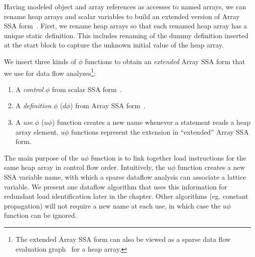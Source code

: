 Having modeled object and array references as accesses to
named arrays, we can rename heap arrays and scalar variables
to build an extended version of Array SSA form~\cite{KnSa98}.
First, we rename heap arrays so
that each renamed heap array
has a unique static definition.
This includes renaming of the dummy definition 
inserted at the start block to capture the unknown initial value
of the heap array.

We insert three kinds of $\phi$ functions 
to obtain an {\it extended}
Array SSA form that we use for data flow analyses\footnote{The extended
Array SSA form can also be viewed as a
sparse data flow evaluation graph~\cite{ChCF91} for
a heap array.}:
\begin{enumerate}
\item 
A {\em control} $\phi$ from scalar SSA form~\cite{CFRWZ91a}.
\item
A {\em definition} $\phi$ ($d\phi$) from Array SSA form~\cite{KnSa98,KnSa98b}.
\item
A {\em use} $\phi$ ($u\phi$) function creates
a new name whenever a statement reads a heap array element.
$u\phi$ functions represent the extension
in ``extended'' Array SSA form.

\end{enumerate}
The main purpose of the $u\phi$ function is to link
together load instructions for the same heap array in control
flow order.   Intuitively, the $u\phi$ function creates a new
SSA variable name, with which a sparse dataflow analysis can
associate a lattice variable.  We present one dataflow algorithm that 
uses this information for redundant load identification later in 
the chapter.  Other algorithms (eg. constant propagation) will not require a 
new name at each use, in which case the $u\phi$ function can be
ignored.
